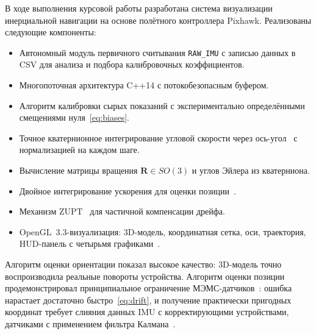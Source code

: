 \documentclass[../main.tex]{subfiles}
\begin{document}
В ходе выполнения курсовой работы разработана система визуализации
инерциальной навигации на основе полётного контроллера Pixhawk.
Реализованы следующие компоненты:
\begin{itemize}[leftmargin=2cm]
    \item Автономный модуль первичного считывания \texttt{RAW\_IMU} с записью
          данных в CSV для анализа и подбора калибровочных коэффициентов.
    \item Многопоточная архитектура C++14 с потокобезопасным буфером.
    \item Алгоритм калибровки сырых показаний с экспериментально
          определёнными смещениями нуля~\eqref{eq:biases}.
    \item Точное кватернионное интегрирование угловой скорости через
          ось-угол~\cite{kuipers1999} с нормализацией на каждом шаге.
    \item Вычисление матрицы вращения $\mathbf{R}\in SO(3)$ и углов Эйлера
          из кватерниона.
    \item Двойное интегрирование ускорения для оценки позиции~\cite{groves2013}.
    \item Механизм ZUPT~\cite{skog2010} для частичной компенсации дрейфа.
    \item OpenGL~3.3-визуализация: 3D-модель, координатная
          сетка, оси, траектория, HUD-панель
          с четырьмя графиками~\cite{glfw_docs}.
\end{itemize}
 
Алгоритм оценки ориентации показал высокое качество: 3D-модель точно
воспроизводила реальные повороты устройства. Алгоритм оценки позиции
продемонстрировал принципиальное ограничение МЭМС-датчиков~\cite{titterton2004}:
ошибка нарастает достаточно быстро~\eqref{eq:drift}, и получение
практически пригодных координат требует слияния данных IMU с корректирующими
устройствами, датчиками с применением фильтра Калмана~\cite{groves2013}.
\end{document}
